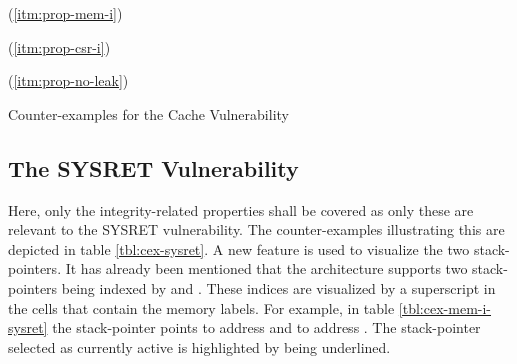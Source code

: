\begin{table}
    \begin{subtable}{\textwidth}
        \centering
        
        \caption{ (\ref{itm:prop-mem-i})}
        \label{tbl:cex-mem-i-cache-vuln}
    \end{subtable}

    \begin{subtable}{\textwidth}
        \centering
        
        \caption{ (\ref{itm:prop-csr-i})}
        \label{tbl:cex-csr-i-cache-vuln}
    \end{subtable}

    \begin{subtable}{\textwidth}
        \centering
        
        \caption{ (\ref{itm:prop-no-leak})}
        \label{tbl:cex-no-leak-cache-vuln}
    \end{subtable}
    \caption{Counter-examples for the Cache Vulnerability}
    \label{tbl:cex-cache-vuln}
\end{table}

\subsection{The SYSRET Vulnerability}

Here, only the integrity-related properties shall be covered as only these are relevant to the SYSRET vulnerability.
The counter-examples illustrating this are depicted in table \ref{tbl:cex-sysret}.
A new feature is used to visualize the two stack-pointers.
It has already been mentioned that the architecture supports two stack-pointers being indexed by  and .
These indices are visualized by a superscript in the cells that contain the memory labels.
For example, in table \ref{tbl:cex-mem-i-sysret} the stack-pointer  points to address  and  to address .
The stack-pointer selected as currently active is highlighted by being underlined.

